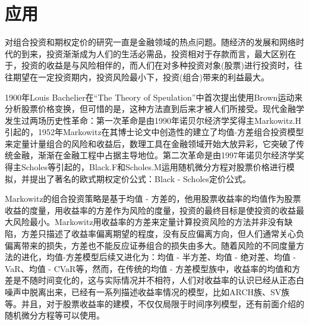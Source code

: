 \section{应用}
    \par
    对组合投资和期权定价的研究一直是金融领域的热点问题。随经济的发展和网络时代的到来，投资渐渐成为人们的生活必需品，投资相对于存款而言，最大区别在于，投资的收益是与风险相伴的，而人们在对多种投资对象(股票)进行投资时，往往期望在一定投资期内，投资风险最小下，投资(组合)带来的利益最大。
    \par
    1900年Louis Bachelier在“The Theory of Speulation”中首次提出使用Brown运动来分析股票价格变换，但可惜的是，这种方法直到后来才被人们所接受。现代金融学发生过两场历史性革命：第一次革命是由1990年诺贝尔经济学奖得主Markowitz.H引起的，1952年Markowitz在其博士论文中创造性的建立了均值-方差组合投资模型来定量计量组合的风险和收益后，数理工具在金融领域开始大放异彩，它突破了传统金融，渐渐在金融工程中占据主导地位。第二次革命是由1997年诺贝尔经济学奖得主Scholes等引起的，Black.F和Scholes.M运用随机微分方程对股票价格进行模拟，并提出了著名的欧式期权定价公式：Black - Scholes定价公式。
    \par
    Markowitz的组合投资策略是基于均值 - 方差的，他用股票收益率的均值作为股票收益的度量，用收益率的方差作为风险的度量，投资的最终目标是使投资的收益最大风险最小。Markowitz用收益率的方差来定量计算投资风险的方法并非没有缺陷，方差只描述了收益率偏离期望的程度，没有反应偏离方向，但人们通常关心负偏离带来的损失，方差也不能反应证券组合的损失由多大。随着风险的不同度量方法的进化，均值-方差模型后续又进化为：均值 - 半方差、均值 - 绝对差、均值 - VaR、均值 - CVaR等，然而，在传统的均值 - 方差模型族中，收益率的均值和方差是不随时间变化的，这与实际情况并不相符，人们对收益率的认识已经从正态白噪声中脱离出来，已经有一系列描述收益率情况的模型，比如ARCH族、SV族等。并且，对于股票收益率的建模，不仅仅局限于时间序列模型，还有前面介绍的随机微分方程等可以使用。
